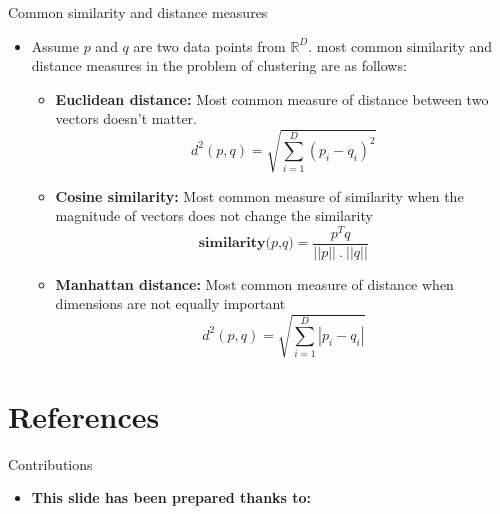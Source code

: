 \documentclass[serif, aspectratio=169]{beamer}
\begin{document}
\begin{frame}{Common similarity and distance measures}
    \begin{itemize}
        \item Assume \( p \) and \( q \) are two data points from $ \mathbb{R}^D$. most common similarity and distance measures in the problem of clustering are as follows:
        \begin{itemize}
            \item \textbf{Euclidean distance:} Most common measure of distance between two vectors doesn't matter.
            \[
            d^2(p,q)=\sqrt{{\sum_{i=1}^{D}{(p_i-q_i)^2}}}
            \]
            \item \textbf{Cosine similarity:} Most common measure of similarity when the magnitude of vectors does not change the similarity
            \[
            \textbf{similarity(\(p\),\(q\))}=\frac{p^T q}{||p|| \ . \ ||q||}
            \]
            \item \textbf{Manhattan distance:} Most common measure of distance when dimensions are not equally important
            \[
            d^2(p,q)=\sqrt{\sum_{i=1}^{D} |p_i-q_i|}
            \]
        \end{itemize}
    \end{itemize}
\end{frame}

\section{References}

\begin{frame}{Contributions}
\begin{itemize}
\item \textbf{This slide has been prepared thanks to:}
\begin{itemize}
\end{itemize}
\end{itemize}

\end{frame}

\begin{frame}[allowframebreaks]
    
    
    \nocite{*}
\end{frame}
\end{document}
